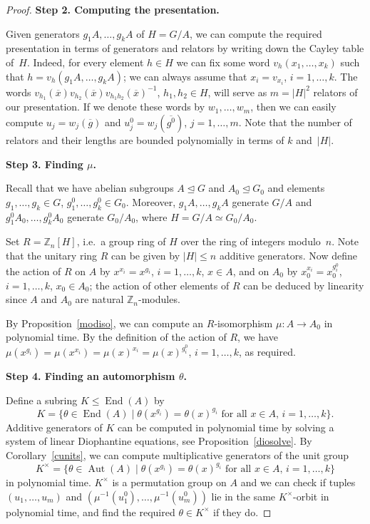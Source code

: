 \documentclass{article}
\DeclareMathOperator{\End}{End}
\DeclareMathOperator{\Aut}{Aut}
\begin{document}
\begin{proof}
	\noindent
	\textbf{Step 2. Computing the presentation.}
	\medskip

	Given generators \( g_1A, \dots, g_kA \) of \( H = G/A \), we can compute the required presentation in terms of generators
	and relators by writing down the Cayley table of~\( H \). Indeed, for every element \( h \in H \) we can fix some word \( v_h(x_1, \dots, x_k) \)
	such that \( h = v_h(g_1A, \dots, g_kA) \); we can always assume that \( x_i = v_{x_i} \), \( i = 1, \dots, k \).
	The words \( v_{h_1}(\overline{x})v_{h_2}(\overline{x})v_{h_1h_2}(\overline{x})^{-1} \), \( h_1, h_2 \in H \),
	will serve as \( m = |H|^2 \) relators of our presentation. If we denote these words by \( w_1, \dots, w_m \),
	then we can easily compute \( u_j = w_j(\overline{g}) \) and \( u^0_j = w_j(\overline{g^0}) \), \( j = 1, \dots, m \).
	Note that the number of relators and their lengths are bounded polynomially in terms of \( k \) and~\( |H| \).
	\medskip

	\noindent
	\textbf{Step 3. Finding \( \mu \).}
	\medskip

	Recall that we have abelian subgroups \( A \unlhd G \) and \( A_0 \unlhd G_0 \)
	and elements \( g_1, \dots, g_k \in G \), \( g^0_1, \dots, g^0_k \in G_0 \).
	Moreover, \( g_1A, \dots, g_kA \) generate \( G/A \) and \( g^0_1A_0, \dots, g^0_kA_0 \) generate \( G_0/A_0 \), where \( H = G/A \simeq G_0/A_0 \).

	Set \( R = \mathbb{Z}_n[H] \), i.e.\ a group ring of \( H \) over the ring of integers modulo~\( n \).
	Note that the unitary ring \( R \) can be given by \( |H| \leq n \) additive generators.
	Now define the action of \( R \) on \( A \) by \( x^{x_i} = x^{g_i} \), \( i = 1, \dots, k \), \( x \in A \),
	and on \( A_0 \) by \( x_0^{x_i} = x_0^{g^0_i} \), \( i = 1, \dots, k \), \( x_0 \in A_0 \);
	the action of other elements of \( R \) can be deduced by linearity since \( A \) and \( A_0 \) are natural \( \mathbb{Z}_n \)-modules.

	By Proposition~\ref{modiso}, we can compute an \( R \)-isomorphism \( \mu : A \to A_0 \) in polynomial time.
	By the definition of the action of \( R \), we have \( \mu(x^{g_i}) = \mu(x^{x_i}) = \mu(x)^{x_i} = \mu(x)^{g^0_i} \), \( i = 1, \dots, k \), as required.
	\medskip

	\noindent
	\textbf{Step 4. Finding an automorphism \( \theta \).}
	\medskip

	Define a subring \( K \leq \End(A) \) by
	\[ K = \{ \theta \in \End(A) \mid \theta(x^{g_i}) = \theta(x)^{g_i} \text{ for all } x \in A,\, i = 1, \dots, k \}. \]
	Additive generators of \( K \) can be computed in polynomial time by solving a system of linear Diophantine equations,
	see Proposition~\ref{diosolve}. By Corollary~\ref{cunits}, we can compute multiplicative generators of the unit group
	\[ K^\times = \{ \theta \in \Aut(A) \mid \theta(x^{g_i}) = \theta(x)^{g_i} \text{ for all } x \in A,\, i = 1, \dots, k \} \]
	in polynomial time. \( K^\times \) is a permutation group on \( A \) and we can check if tuples
	\( (u_1, \dots, u_m) \) and \( (\mu^{-1}(u^0_1), \dots, \mu^{-1}(u^0_m)) \) lie in the same \( K^\times \)-orbit in
	polynomial time, and find the required \( \theta \in K^\times \) if they do.
	\medskip


\end{proof}
\end{document}

